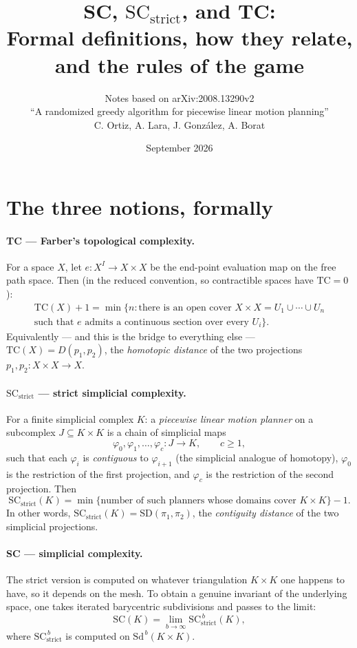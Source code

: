 \documentclass[11pt]{article}
\title{SC, $\mathrm{SC}_{\mathrm{strict}}$, and TC:\\
\large Formal definitions, how they relate, and the rules of the game}
\author{Notes based on arXiv:2008.13290v2\\
\small ``A randomized greedy algorithm for piecewise linear motion planning''\\
\small C. Ortiz, A. Lara, J. Gonz\'alez, A. Borat}
\date{September 2026}
\theoremstyle{definition}
\begin{document}
\maketitle

\section{The three notions, formally}

\paragraph{TC --- Farber's topological complexity.}
For a space $X$, let $e : X^I \to X \times X$ be the end-point evaluation map on the
free path space. Then (in the reduced convention, so contractible spaces have
$\mathrm{TC}=0$):
\begin{multline*}
\mathrm{TC}(X)+1
= \min\bigl\{n : \text{there is an open cover }
X\times X = U_1\cup\cdots\cup U_n\\
\text{such that } e \text{ admits a continuous section over every } U_i\bigr\}.
\end{multline*}
Equivalently --- and this is the bridge to everything else ---
$\mathrm{TC}(X) = D(p_1, p_2)$, the \emph{homotopic distance} of the two
projections $p_1, p_2 : X\times X \to X$.

\paragraph{$\mathrm{SC}_{\mathrm{strict}}$ --- strict simplicial complexity.}
For a finite simplicial complex $K$: a \emph{piecewise linear motion planner} on a
subcomplex $J \subseteq K\times K$ is a chain of simplicial maps
\[
\varphi_0, \varphi_1, \dots, \varphi_c : J \longrightarrow K, \qquad c \geq 1,
\]
such that each $\varphi_i$ is \emph{contiguous} to $\varphi_{i+1}$ (the simplicial
analogue of homotopy), $\varphi_0$ is the restriction of the first projection,
and $\varphi_c$ is the restriction of the second projection. Then
\[
\mathrm{SC}_{\mathrm{strict}}(K)
= \min\bigl\{\text{number of such planners whose domains cover } K\times K\bigr\} - 1.
\]
In other words,
$\mathrm{SC}_{\mathrm{strict}}(K) = \mathrm{SD}(\pi_1,\pi_2)$, the
\emph{contiguity distance} of the two simplicial projections.

\paragraph{SC --- simplicial complexity.}
The strict version is computed on whatever triangulation $K\times K$ one happens
to have, so it depends on the mesh. To obtain a genuine invariant of the
underlying space, one takes iterated barycentric subdivisions and passes to the
limit:
\[
\mathrm{SC}(K) = \lim_{b\to\infty} \mathrm{SC}^{\,b}_{\mathrm{strict}}(K),
\]
where $\mathrm{SC}^{\,b}_{\mathrm{strict}}$ is computed on
$\mathrm{Sd}^{\,b}(K\times K)$.
\end{document}
